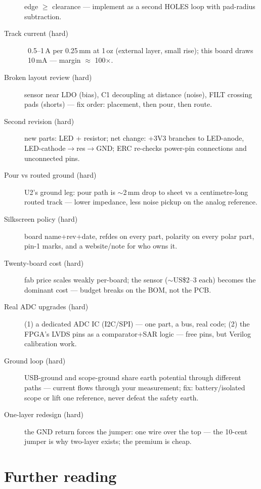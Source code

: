 \begin{description}
edge $\geq$ clearance --- implement as a second HOLES loop with
pad-radius subtraction.
\item[Track current (hard)] ~0.5--1\,A per 0.25\,mm at 1\,oz
(external layer, small rise); this board draws ~10\,mA --- margin
$\approx$ 100$\times$.
\item[Broken layout review (hard)] sensor near LDO (bias), C1
decoupling at distance (noise), FILT crossing pads (shorts) ---
fix order: placement, then pour, then route.
\item[Second revision (hard)] new parts: LED + resistor; net change:
+3V3 branches to LED-anode, LED-cathode$\to$res$\to$GND; ERC
re-checks power-pin connections and unconnected pins.
\item[Pour vs routed ground (hard)] U2's ground leg: pour path is
$\sim$2\,mm drop to sheet vs a centimetre-long routed track ---
lower impedance, less noise pickup on the analog reference.
\item[Silkscreen policy (hard)] board name+rev+date, refdes on every
part, polarity on every polar part, pin-1 marks, and a website/note
for who owns it.
\item[Twenty-board cost (hard)] fab price scales weakly per-board;
the sensor ($\sim$US\$2--3 each) becomes the dominant cost ---
budget breaks on the BOM, not the PCB.
\item[Real ADC upgrades (hard)] (1) a dedicated ADC IC (I2C/SPI)
--- one part, a bus, real code; (2) the FPGA's LVDS pins as a
comparator+SAR logic --- free pins, but Verilog calibration work.
\item[Ground loop (hard)] USB-ground and scope-ground share earth
potential through different paths --- current flows through your
measurement; fix: battery/isolated scope or lift one reference,
never defeat the safety earth.
\item[One-layer redesign (hard)] the GND return forces the jumper:
one wire over the top --- the 10-cent jumper is why two-layer
exists; the premium is cheap.
\end{description}

\section*{Further reading}

